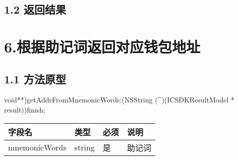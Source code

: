 \documentclass[letterpaper,10pt,english]{sphinxmanual}
\begin{document}
\subsection{1.2 返回结果}
\label{\detokenize{BCBWalletSDK_u63a5_u53e3_u8bf4_u660e:id110}}

\begin{sphinxVerbatim}[commandchars=\\\{\}]
     
     
\end{sphinxVerbatim}


\begin{sphinxVerbatim}[commandchars=\\\{\}]
     
\end{sphinxVerbatim}


\section{6.根据助记词返回对应钱包地址}
\label{\detokenize{BCBWalletSDK_u63a5_u53e3_u8bf4_u660e:id111}}

\subsection{1.1 方法原型}
\label{\detokenize{BCBWalletSDK_u63a5_u53e3_u8bf4_u660e:id112}}
\sphinxstylestrong{-(}void**)getAddrFromMnemonicWords:(NSString (\textasciicircum{})(ICSDKResultModel * result))finish;



\begin{savenotes}\sphinxattablestart
\centering
\begin{tabulary}{\linewidth}[t]{|T|T|T|T|}
\hline
\sphinxstyletheadfamily 
字段名
&\sphinxstyletheadfamily 
类型
&\sphinxstyletheadfamily 
必须
&\sphinxstyletheadfamily 
说明
\\
\hline
mnemonicWords
&
string
&
是
&
助记词
\\
\hline
\end{tabulary}
\par
\sphinxattableend\end{savenotes}
\end{document}
